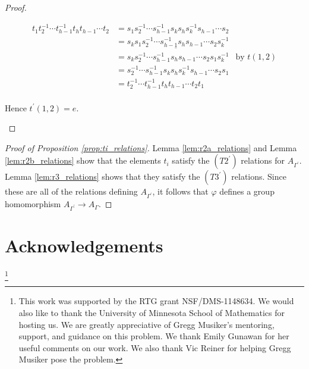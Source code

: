 \documentclass[11pt]{amsart}
\theoremstyle{definition}
\begin{document}
\begin{proof}
\begin{enumerate}[a)]
\begin{align*}
t_1t_2^{-1}\cdots t_{h-1}^{-1}t_ht_{h-1}\cdots t_2 &= s_1s_2^{-1}\cdots s_{h-1}^{-1}s_ks_hs_k^{-1}s_{h-1}\cdots s_2\\
&= s_k\underline{s_1s_2^{-1}\cdots s_{h-1}^{-1}s_hs_{h-1}\cdots s_2}s_k^{-1}\\
&= s_ks_2^{-1}\cdots s_{h-1}^{-1}s_hs_{h-1}\cdots s_2s_1s_k^{-1} &\text{by } t(1,2)\\
&= s_2^{-1}\cdots s_{h-1}^{-1}s_ks_hs_k^{-1}s_{h-1}\cdots s_2s_1\\
&= t_2^{-1}\cdots t_{h-1}^{-1}t_ht_{h-1}\cdots t_2t_1\\
\end{align*}

\noindent Hence $t^\prime(1,2) = e$.
\end{enumerate}
\end{proof}


\begin{proof}[Proof of Proposition \ref{prop:ti_relations}]
Lemma \ref{lem:r2a_relations} and Lemma \ref{lem:r2b_relations} show that the elements $t_i$ satisfy the $(T2^\prime)$ relations for $A_{\Gamma^\prime}$. Lemma \ref{lem:r3_relations} shows that they satisfy the $(T3^\prime)$ relations. Since these are all of the relations defining $A_{\Gamma^\prime}$, it follows that $\varphi$ defines a group homomorphism $A_{\Gamma^\prime}\rightarrow A_\Gamma$.
\end{proof}

\section{Acknowledgements}
\thanks{This work was supported by the RTG grant NSF/DMS-1148634. We would also like to thank the University of Minnesota School of Mathematics for hosting us. We are greatly appreciative of Gregg Musiker's mentoring, support, and guidance on this problem. We thank Emily Gunawan for her useful comments on our work. We also thank Vic Reiner for helping Gregg Musiker pose the problem.}



\end{document}
